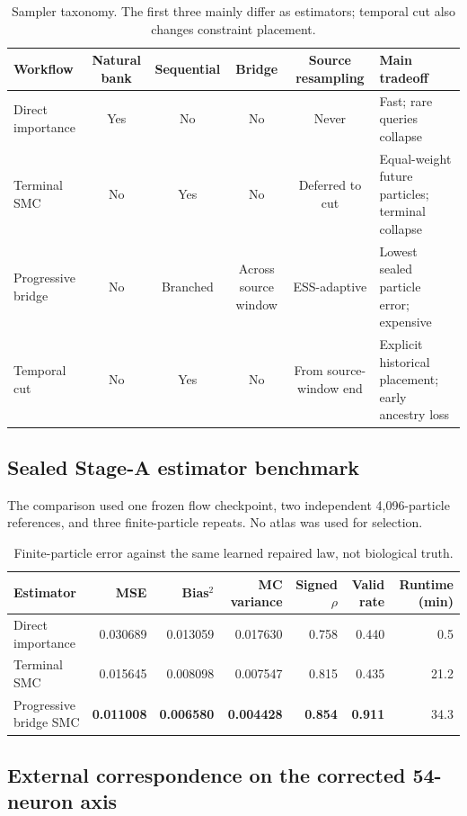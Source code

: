 \documentclass[10pt]{article}
\newcommand{\best}[1]{\ifmmode\boldsymbol{#1}\else\textbf{#1}\fi}
\begin{document}
\begin{table}[H]
\centering\small
\begin{tabularx}{\linewidth}{L{2.6cm}ccccY}
\toprule Workflow & Natural bank & Sequential & Bridge & Source resampling & Main tradeoff \\
\midrule
Direct importance & Yes & No & No & Never & Fast; rare queries collapse \\
Terminal SMC & No & Yes & No & Deferred to cut & Equal-weight future particles; terminal collapse \\
Progressive bridge & No & Branched & Across source window & ESS-adaptive & Lowest sealed particle error; expensive \\
Temporal cut & No & Yes & No & From source-window end & Explicit historical placement; early ancestry loss \\
\bottomrule
\end{tabularx}
\caption{Sampler taxonomy. The first three mainly differ as estimators; temporal cut also changes constraint placement.}
\end{table}

\subsection{Sealed Stage-A estimator benchmark}

The comparison used one frozen flow checkpoint, two independent 4,096-particle references, and three finite-particle repeats. No atlas was used for selection.

\begin{table}[H]
\centering\small
\begin{tabular}{lrrrrrr}
\toprule
Estimator & MSE & Bias$^2$ & MC variance & Signed $\rho$ & Valid rate & Runtime (min) \\
\midrule
Direct importance & 0.030689 & 0.013059 & 0.017630 & 0.758 & 0.440 & 0.5 \\
Terminal SMC & 0.015645 & 0.008098 & 0.007547 & 0.815 & 0.435 & 21.2 \\
Progressive bridge SMC & \best{0.011008} & \best{0.006580} & \best{0.004428} & \best{0.854} & \best{0.911} & 34.3 \\
\bottomrule
\end{tabular}
\caption{Finite-particle error against the same learned repaired law, not biological truth.}
\end{table}

\subsection{External correspondence on the corrected 54-neuron axis}
\end{document}
